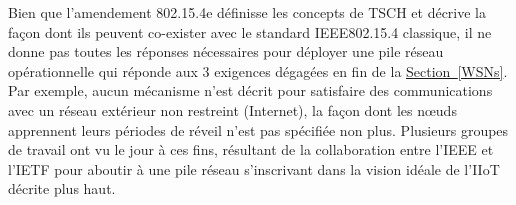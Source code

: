 \documentclass[]{report}
\newcommand{\wordlink}[2]{\hyperref[#2]{#1~\ref{#2}}}
\begin{document}
\par Bien que l'amendement 802.15.4e définisse les concepts de TSCH et décrive la façon dont ils peuvent co-exister avec le standard IEEE802.15.4 classique, il ne donne pas toutes les réponses nécessaires pour déployer une pile réseau opérationnelle qui réponde aux 3 exigences dégagées en fin de la \wordlink{Section}{WSNs}. Par exemple, aucun mécanisme n'est décrit pour satisfaire des communications avec un réseau extérieur non restreint (Internet), la façon dont les nœuds apprennent leurs périodes de réveil n'est pas spécifiée non plus. Plusieurs groupes de travail ont vu le jour à ces fins, résultant de la collaboration entre l'IEEE et l'IETF pour aboutir à une pile réseau s'inscrivant dans la vision idéale de l'IIoT décrite plus haut.\\

\newpage
\end{document}

